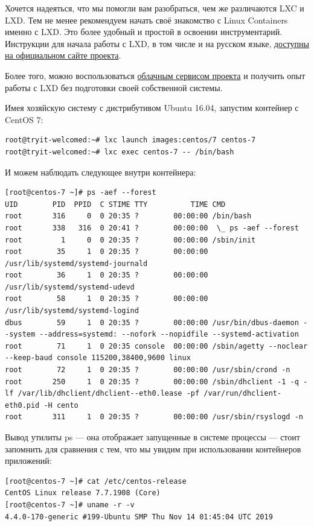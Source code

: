 \documentclass[14pt, a4paper]{article}
\begin{document}
Хочется надеяться, что мы помогли вам разобраться, чем же различаются LXC и LXD. Тем не менее
рекомендуем начать своё знакомство с Linux Containers именно с LXD. Это более удобный и простой в
освоении инструментарий. Инструкции для начала работы с LXD, в том числе и на русском языке,
\href{https://linuxcontainers.org/ru/lxd/getting-started-cli/}{доступны на официальном сайте проекта}.

Более того, можно воспользоваться \href{https://linuxcontainers.org/lxd/try-it/}{облачным сервисом проекта} и получить опыт работы с LXD без
подготовки своей собственной системы.

Имея хозяйскую систему с дистрибутивом Ubuntu 16.04, запустим контейнер с CentOS 7:

\begin{lstlisting}
root@tryit-welcomed:~# lxc launch images:centos/7 centos-7
root@tryit-welcomed:~# lxc exec centos-7 -- /bin/bash
\end{lstlisting}

И можем наблюдать следующее внутри контейнера:\\
\begin{lstlisting}
[root@centos-7 ~]# ps -aef --forest
UID        PID  PPID  C STIME TTY          TIME CMD
root       316     0  0 20:35 ?        00:00:00 /bin/bash
root       338   316  0 20:41 ?        00:00:00  \_ ps -aef --forest
root         1     0  0 20:35 ?        00:00:00 /sbin/init
root        35     1  0 20:35 ?        00:00:00 /usr/lib/systemd/systemd-journald
root        36     1  0 20:35 ?        00:00:00 /usr/lib/systemd/systemd-udevd
root        58     1  0 20:35 ?        00:00:00 /usr/lib/systemd/systemd-logind
dbus        59     1  0 20:35 ?        00:00:00 /usr/bin/dbus-daemon --system --address=systemd: --nofork --nopidfile --systemd-activation
root        71     1  0 20:35 console  00:00:00 /sbin/agetty --noclear --keep-baud console 115200,38400,9600 linux
root        72     1  0 20:35 ?        00:00:00 /usr/sbin/crond -n
root       250     1  0 20:35 ?        00:00:00 /sbin/dhclient -1 -q -lf /var/lib/dhclient/dhclient--eth0.lease -pf /var/run/dhclient-eth0.pid -H cento 
root       311     1  0 20:35 ?        00:00:00 /usr/sbin/rsyslogd -n
\end{lstlisting}

Вывод утилиты ps — она отображает запущенные в системе процессы — стоит запомнить для
сравнения с тем, что мы увидим при использовании контейнеров приложений:

\begin{lstlisting}
[root@centos-7 ~]# cat /etc/centos-release
CentOS Linux release 7.7.1908 (Core)
[root@centos-7 ~]# uname -r -v
4.4.0-170-generic #199-Ubuntu SMP Thu Nov 14 01:45:04 UTC 2019
\end{lstlisting}
\end{document}
